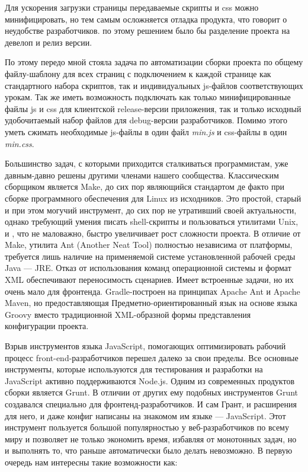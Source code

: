 Для ускорения загрузки страницы передаваемые скрипты и css можно минифицировать, но тем самым осложняется отладка продукта, что говорит о неудобстве разработчиков. по этому решением было бы разделение проекта на девелоп и релиз версии.

По этому передо мной стояла задача по автоматизации сборки проекта по общему файлу-шаблону для всех страниц с подключением к каждой странице как стандартного набора скриптов, так и индивидуальных js-файлов соответствующих урокам. Так же иметь возможность подключать как только минифицированные файлы js и css для клиентской release-версии приложения, так и  только исходный удобочитаемый набор файлов для debug-версии разработчиков. Помимо этого уметь сжимать необходимые js-файлы в один файл \textit{min.js} и css-файлы в один \textit{min.css}.

Большинство задач, с которыми приходится сталкиваться программистам, уже давным-давно решены другими членами нашего сообщества. Классическим сборщиком является Make, до сих пор являющийся стандартом де факто при сборке программного обеспечения для Linux из исходников. Это простой, старый и при этом могучий инструмент, до сих пор не утративший своей актуальности, однако требующий умения писать shell-скрипты и пользоваться утилитами Unix, и , что не маловажно, быстро увеличивает рост сложности проекта. В отличие от Make, утилита Ant (Another Neat Tool)  полностью независима от платформы, требуется лишь наличие на применяемой системе установленной рабочей среды Java — JRE. Отказ от использования команд операционной системы и формат XML обеспечивают переносимость сценариев. Имеет встроенные задачи, но их очень мало для фронтенда. Gradle-построен на принципах Apache Ant и Apache Maven, но предоставляющая Предметно-ориентированный язык на основе языка Groovy вместо традиционной XML-образной формы представления конфигурации проекта.

Взрыв инструментов языка JavaScript, помогающих оптимизировать рабочий процесс front-end-разработчиков  перешел далеко за свои пределы. Все основные инструменты, которые используются для тестирования и разработки на JavaScript активно поддерживаются Node.js. Одним из современных продуктов сборки является Grunt. В отличии от других ему подобных инструментов Grunt создавался специально для фронтенд-разработчиков. И сам Грант, и расширения для него, и даже конфиг написаны на знакомом им языке --- JavaScript. Этот инструмент пользуется большой популярностью у веб-разработчиков по всему миру и позволяет не только экономить время, избавляя от монотонных задач, но и выполнять то, что раньше автоматически было делать невозможно. В первую очередь нам интересны такие возможности как:


